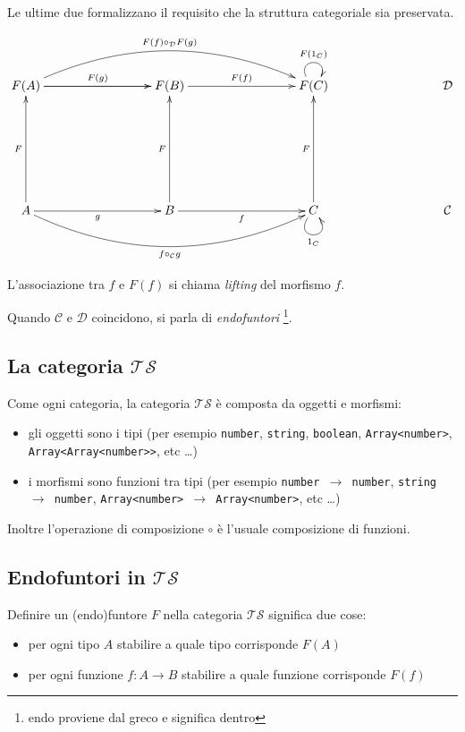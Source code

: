 \documentclass[12pt]{article}
\begin{document}
Le ultime due formalizzano il requisito che la struttura categoriale sia preservata.

\[
\xymatrixrowsep{3cm}
\xymatrixcolsep{3cm}
\xymatrix{
  F(A) \ar[r]^{F(g)} \ar[r] \ar@/^1cm/[rr]^{F(f) \circ_\mathcal{D} F(g)} & F(B) \ar[r]^{F(f)} & F(C) \ar@(ul,ur)^{F(1_C)} & \mathcal{D} \\
  A \ar[u]^F \ar[r]_g \ar@/_1cm/[rr]_{f \circ_\mathcal{C} g}  & B \ar[u]^F \ar[r]_f & C \ar[u]^F \ar@(dl,dr)_{1_C} & \mathcal{C}
}
\]

L'associazione tra $f$ e $F(f)$ si chiama \emph{lifting} del morfismo $f$.

Quando $\mathcal{C}$ e $\mathcal{D}$ coincidono, si parla di \emph{endofuntori} \footnote{endo proviene dal greco e significa dentro}.

\subsection{La categoria $\mathcal{TS}$}

Come ogni categoria, la categoria $\mathcal{TS}$ è composta da oggetti e morfismi:

\begin{itemize}
  \item gli oggetti sono i tipi (per esempio \texttt{number}, \texttt{string}, \texttt{boolean}, \texttt{Array<number>}, \texttt{Array<Array<number>>}, etc \ldots)
  \item i morfismi sono funzioni tra tipi (per esempio \texttt{number $\rightarrow$ number}, \texttt{string $\rightarrow$ number}, \texttt{Array<number> $\rightarrow$ Array<number>}, etc \ldots)
\end{itemize}

Inoltre l'operazione di composizione $\circ$ è l'usuale composizione di funzioni.

\subsection{Endofuntori in $\mathcal{TS}$}

Definire un (endo)funtore $F$ nella categoria $\mathcal{TS}$ significa due cose:

\begin{itemize}
  \item per ogni tipo $A$ stabilire a quale tipo corrisponde $F(A)$
  \item per ogni funzione $f: A \rightarrow B$ stabilire a quale funzione corrisponde $F(f)$
\end{itemize}
\end{document}
